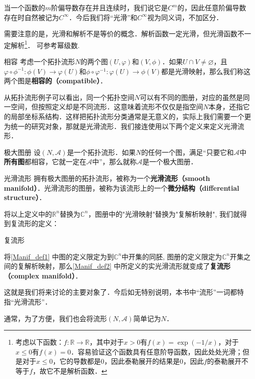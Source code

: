 当一个函数的$m$阶偏导数存在并且连续时，我们说它是$C^m$的，因此任意阶偏导数存在时自然被记为$C^\infty$．今后我们将“光滑”和$C^\infty$视为同义词，不加区分．

需要注意的是，光滑和解析不是等价的概念．解析函数一定光滑，但光滑函数不一定解析\footnote{考虑以下函数：$f:\mathbb{R}\rightarrow\mathbb{R}$，其中对于$x>0$有$f(x)=\exp(-1/x)$，对于$x\leq 0$有$f(x)=0$．容易验证这个函数具有任意阶导函数，因此处处光滑；但是对于$x\leq 0$，它的导数都是$0$，因此泰勒展开的结果是$0$，因此$f$的泰勒展开不等于$f$，故它不是解析函数．}． 可参考幂级数.

\begin{definition}{相容}
考虑一个拓扑流形$N$的两个图$(U, \varphi)$和$(V, \phi)$．如果$U\cap V\not=\varnothing$，且$\varphi\circ\phi^{-1}:\phi(V)\rightarrow\varphi(U)$和$\phi\circ\varphi^{-1}:\varphi(U)\rightarrow\phi(V)$都是光滑映射，那么我们称这两个图是\textbf{相容的（compatible）}．
\end{definition}

从拓扑流形例子可以看出，同一个拓扑空间$N$可以有不同的图册，对应的虽然是同一空间，但按照定义却是不同流形．这意味着流形不仅仅是指空间$N$本身，还指它的局部坐标系结构．这样把拓扑流形分类通常是无意义的，实际上我们需要一个更为统一的研究对象，那就是光滑流形．我们接连使用以下两个定义来定义光滑流形．

\begin{definition}{极大图册}
设$(N, \mathcal{A})$是一个拓扑流形．如果$N$的任何一个图，满足“只要它和$\mathcal{A}$中\textbf{所有图}都相容，它就一定在$\mathcal{A}$中”，那么就称$\mathcal{A}$是一个极大图册．
\end{definition}

\begin{definition}{光滑流形}
拥有极大图册的拓扑流形，被称为一个\textbf{光滑流形（smooth manifold）}．光滑流形的图册，被称为该流形上的一个\textbf{微分结构（differential structure）}．
\end{definition}

将以上定义中的$\mathbb{R}^n$替换为$\mathbb{C}^n$，图册中的"光滑映射"替换为"复解析映射", 我们就得到复流形的定义：

\begin{definition}{复流形}

将\autoref{Manif_def1} 中图的定义限定为到$\mathbb{C}^n$中开集的同胚, 图册的定义限定为$\mathbb{C}^n$开集之间的复解析映射，那么\autoref{Manif_def2} 中所定义的实光滑流形就变成了\textbf{复流形（complex manifold）}．

\end{definition}


这就是我们将来讨论的主要对象了．今后如无特别说明，本书中“流形”一词都特指“光滑流形”．

通常，为了方便，我们也会将流形$(N, \mathcal{A})$简单记为$N$．





